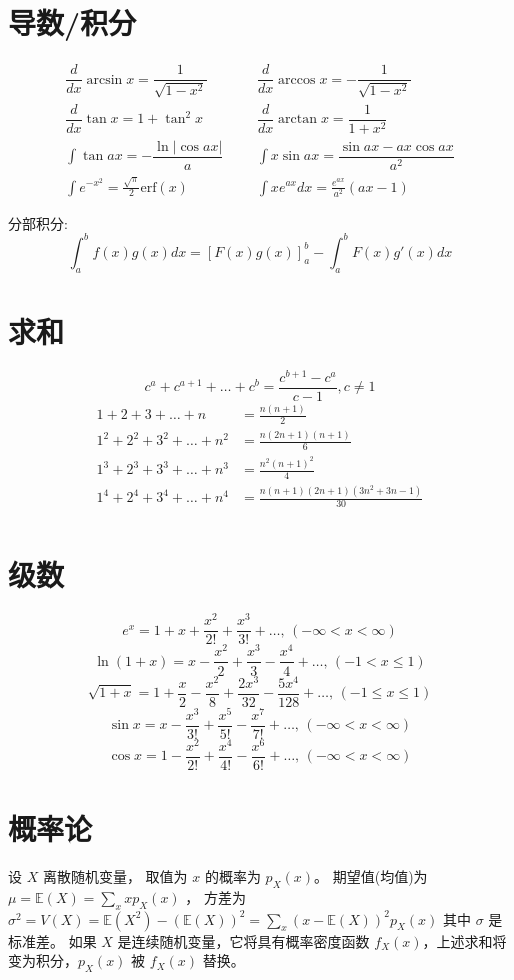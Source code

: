 \section{导数/积分}
\begin{align*}
	\dfrac{d}{dx}\arcsin x = \dfrac{1}{\sqrt{1-x^2}} &&& \dfrac{d}{dx}\arccos x = -\dfrac{1}{\sqrt{1-x^2}} \\
	\dfrac{d}{dx}\tan x = 1+\tan^2 x &&& \dfrac{d}{dx}\arctan x = \dfrac{1}{1+x^2} \\
	\int\tan ax = -\dfrac{\ln|\cos ax|}{a} &&& \int x\sin ax = \dfrac{\sin ax-ax \cos ax}{a^2} \\
	\int e^{-x^2} = \frac{\sqrt \pi}{2} \text{erf}(x) &&& \int xe^{ax}dx = \frac{e^{ax}}{a^2}(ax-1)
\end{align*}

分部积分:
\[\int_a^bf(x)g(x)dx = [F(x)g(x)]_a^b-\int_a^bF(x)g'(x)dx\]

\section{求和}
\[ c^a + c^{a+1} + \dots + c^{b} = \frac{c^{b+1} - c^a}{c-1}, c \neq 1 \]
\begin{align*}
	1 + 2 + 3 + \dots + n &= \frac{n(n+1)}{2} \\
	1^2 + 2^2 + 3^2 + \dots + n^2 &= \frac{n(2n+1)(n+1)}{6} \\
	1^3 + 2^3 + 3^3 + \dots + n^3 &= \frac{n^2(n+1)^2}{4} \\
	1^4 + 2^4 + 3^4 + \dots + n^4 &= \frac{n(n+1)(2n+1)(3n^2 + 3n - 1)}{30} \\
\end{align*}

\section{级数}
$$e^x = 1+x+\frac{x^2}{2!}+\frac{x^3}{3!}+\dots,\,(-\infty<x<\infty)$$
$$\ln(1+x) = x-\frac{x^2}{2}+\frac{x^3}{3}-\frac{x^4}{4}+\dots,\,(-1<x\leq1)$$
$$\sqrt{1+x} = 1+\frac{x}{2}-\frac{x^2}{8}+\frac{2x^3}{32}-\frac{5x^4}{128}+\dots,\,(-1\leq x\leq1)$$
$$\sin x = x-\frac{x^3}{3!}+\frac{x^5}{5!}-\frac{x^7}{7!}+\dots,\,(-\infty<x<\infty)$$
$$\cos x = 1-\frac{x^2}{2!}+\frac{x^4}{4!}-\frac{x^6}{6!}+\dots,\,(-\infty<x<\infty)$$

\section{概率论}
设 $X$ 离散随机变量，
取值为 $x$ 的概率为 $p_X(x)$。
期望值(均值)为 $\mu=\mathbb{E}(X)=\sum_xxp_X(x)$ ，
方差为 $\sigma^2=V(X)=\mathbb{E}(X^2)-(\mathbb{E}(X))^2=\sum_x(x-\mathbb{E}(X))^2p_X(x)$ 
其中 $\sigma$ 是标准差。
如果 $X$ 是连续随机变量，它将具有概率密度函数 $f_X(x)$，上述求和将变为积分，$p_X(x)$ 被 $f_X(x)$ 替换。

